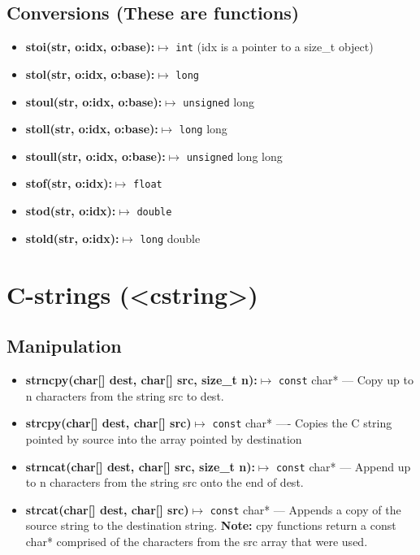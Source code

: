 \documentclass{report}
\begin{document}
    \bigbreak \noindent 
    \subsection{Conversions (These are functions)}
    \begin{itemize}
        \item \textbf{stoi(str, o:idx, o:base):}$\mapsto$ \texttt{int} (idx is a pointer to a size\_t object)
        \item \textbf{stol(str, o:idx, o:base):}$\mapsto$ \texttt{long}
        \item \textbf{stoul(str, o:idx, o:base):}$\mapsto$ \texttt{unsigned} long
        \item \textbf{stoll(str, o:idx, o:base):}$\mapsto$ \texttt{long} long
        \item \textbf{stoull(str, o:idx, o:base):}$\mapsto$ \texttt{unsigned} long long
        \item \textbf{stof(str, o:idx):}$\mapsto$ \texttt{float}
        \item \textbf{stod(str, o:idx):}$\mapsto$ \texttt{double}
        \item \textbf{stold(str, o:idx):}$\mapsto$ \texttt{long} double
    \end{itemize}

    \pagebreak \bigbreak \noindent 
    \section{\LARGE C-strings (<cstring>)}
    \bigbreak \noindent 
    \subsection{Manipulation}
    \begin{itemize}
        \item \textbf{strncpy(char[] dest, char[] src, size\_t n):}$\mapsto$ \texttt{const} char* --- Copy up to n characters from the string src to dest.
        \item \textbf{strcpy(char[] dest, char[] src)}$\mapsto$ \texttt{const} char* ---- Copies the C string pointed by source into the array pointed by destination
        \item \textbf{strncat(char[] dest, char[] src, size\_t n):}$\mapsto$ \texttt{const} char* --- Append up to n characters from the string src onto the end of dest.
        \item \textbf{strcat(char[] dest, char[] src)}$\mapsto$ \texttt{const} char* --- Appends a copy of the source string to the destination string.
        \bigbreak \noindent 
        \textbf{Note:} cpy functions return a const char* comprised of the characters from the src array that were used.
    \end{itemize}
\end{document}
